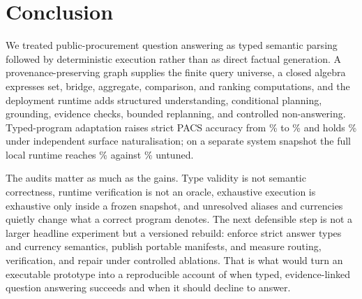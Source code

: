 \section{Conclusion}

We treated public-procurement question answering as typed semantic parsing followed by
deterministic execution rather than as direct factual generation.  A provenance-preserving graph
supplies the finite query universe, a closed algebra expresses set, bridge, aggregate,
comparison, and ranking computations, and the deployment runtime adds structured understanding,
conditional planning, grounding, evidence checks, bounded replanning, and controlled
non-answering.  Typed-program adaptation raises strict PACS accuracy from \PacsBaseA\% to
\PacsOursA\% and holds \PacsOursB\% under independent surface naturalisation; on a separate
system snapshot the full local runtime reaches \RuntimeOurs\% against \RuntimeBase\% untuned.

The audits matter as much as the gains.  Type validity is not semantic correctness, runtime
verification is not an oracle, exhaustive execution is exhaustive only inside a frozen snapshot,
and unresolved aliases and currencies quietly change what a correct program denotes.  The next
defensible step is not a larger headline experiment but a versioned rebuild: enforce strict
answer types and currency semantics, publish portable manifests, and measure routing,
verification, and repair under controlled ablations.  That is what would turn an executable
prototype into a reproducible account of when typed, evidence-linked question answering succeeds
and when it should decline to answer.
